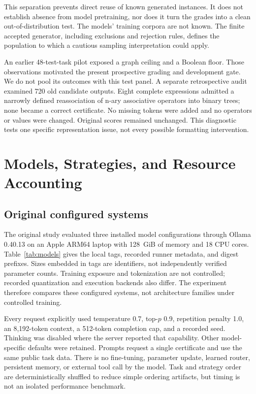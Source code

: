 This separation prevents direct reuse of known generated instances. It does not establish absence from model pretraining, nor does it turn the grades into a clean out-of-distribution test. The models' training corpora are not known. The finite accepted generator, including exclusions and rejection rules, defines the population to which a cautious sampling interpretation could apply.

An earlier 48-test-task pilot exposed a graph ceiling and a Boolean floor. Those observations motivated the present prospective grading and development gate. We do not pool its outcomes with this test panel. A separate retrospective audit examined 720 old candidate outputs. Eight complete expressions admitted a narrowly defined reassociation of n-ary associative operators into binary trees; none became a correct certificate. No missing tokens were added and no operators or values were changed. Original scores remained unchanged. This diagnostic tests one specific representation issue, not every possible formatting intervention.

\section{Models, Strategies, and Resource Accounting}
\label{sec:methods}

\subsection{Original configured systems}

The original study evaluated three installed model configurations through Ollama 0.40.13 on an Apple ARM64 laptop with 128~GiB of memory and 18 CPU cores. Table~\ref{tab:models} gives the local tags, recorded runner metadata, and digest prefixes. Sizes embedded in tags are identifiers, not independently verified parameter counts. Training exposure and tokenization are not controlled; recorded quantization and execution backends also differ. The experiment therefore compares these configured systems, not architecture families under controlled training.

Every request explicitly used temperature 0.7, top-$p$ 0.9, repetition penalty 1.0, an 8,192-token context, a 512-token completion cap, and a recorded seed. Thinking was disabled where the server reported that capability. Other model-specific defaults were retained. Prompts request a single certificate and use the same public task data. There is no fine-tuning, parameter update, learned router, persistent memory, or external tool call by the model. Task and strategy order are deterministically shuffled to reduce simple ordering artifacts, but timing is not an isolated performance benchmark.

